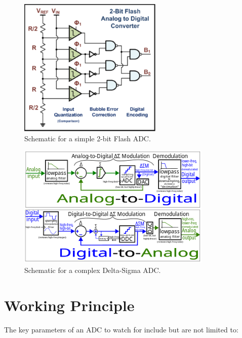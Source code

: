 \documentclass[conference]{IEEEtran}
\begin{document}
\begin{figure}[htbp]
\centerline{\includegraphics{ADCsch.png}}
\caption{Schematic for a simple 2-bit Flash ADC.}
\end{figure}

\begin{figure}[htbp]
\centerline{\includegraphics{ADCschDS.png}}
\caption{Schematic for a complex Delta-Sigma ADC.}
\end{figure}

\section{Working Principle}

The key parameters of an ADC to watch for include but are not limited to:
\end{document}
